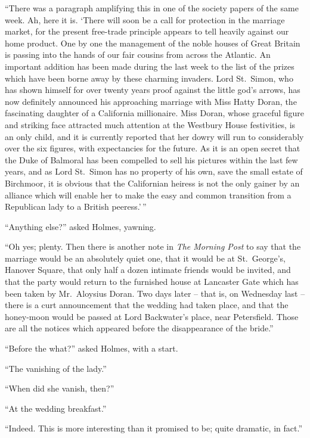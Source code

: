 “There was a paragraph amplifying this in one of the society
papers of the same week. Ah, here it is. ‘There will
soon be a call for protection in the marriage market, for the
present free-trade principle appears to tell heavily against
our home product. One by one the management of the noble
houses of Great Britain is passing into the hands of our fair
cousins from across the Atlantic. An important addition has
been made during the last week to the list of the prizes which
have been borne away by these charming invaders. Lord
St.~Simon, who has shown himself for over twenty years proof
against the little god’s arrows, has now definitely announced
his approaching marriage with Miss Hatty Doran, the fascinating
daughter of a California millionaire. Miss Doran,
whose graceful figure and striking face attracted much attention
at the Westbury House festivities, is an only child, and
it is currently reported that her dowry will run to considerably
over the six figures, with expectancies for the future. As it
is an open secret that the Duke of Balmoral has been compelled
to sell his pictures within the last few years, and as
Lord St.~Simon has no property of his own, save the small
estate of Birchmoor, it is obvious that the Californian heiress
is not the only gainer by an alliance which will enable her to
make the easy and common transition from a Republican
lady to a British peeress.’\,”

“Anything else?” asked Holmes, yawning.

“Oh yes; plenty. Then there is another note in \textit{The Morning
Post} to say that the marriage would be an absolutely quiet
one, that it would be at St.~George’s, Hanover Square, that
only half a dozen intimate friends would be invited, and that
the party would return to the furnished house at Lancaster
Gate which has been taken by Mr.~Aloysius Doran. Two
days later -- that is, on Wednesday last -- there is a curt
announcement that the wedding had taken place, and that the
honey-moon would be passed at Lord Backwater’s place, near
Petersfield. Those are all the notices which appeared before
the disappearance of the bride.”

“Before the what?” asked Holmes, with a start.

“The vanishing of the lady.”

“When did she vanish, then?”

“At the wedding breakfast.”

“Indeed. This is more interesting than it promi\-sed to be;
quite dramatic, in fact.”

